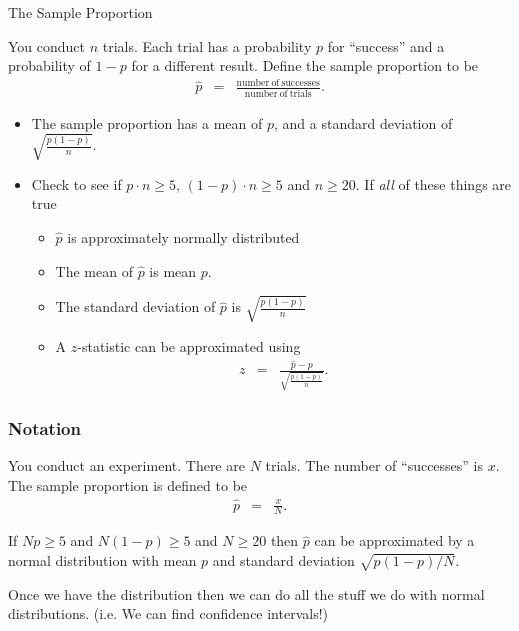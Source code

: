 \begin{frame}{The Sample Proportion}

  You conduct $n$ trials. Each trial has a probability $p$ for
  ``success'' and a probability of $1-p$ for a different
  result. Define the sample proportion to be 
  \begin{eqnarray*}
    \hat{p} & = & \frac{\mathrm{number~of~successes}}{\mathrm{number~of~trials}}.
  \end{eqnarray*}

  \begin{itemize}
  \item The sample proportion has a mean of $p$, and a standard
    deviation of $\sqrt{\frac{p(1-p)}{n}}$.
  \item Check to see if $p\cdot n \geq 5$, $(1-p)\cdot n \geq 5$ and
    $n\geq 20$. If \textit{all} of these things are true
    \begin{itemize}
    \item $\hat{p}$ is approximately normally distributed
    \item The mean of $\hat{p}$ is mean $p$.
    \item The standard deviation of $\hat{p}$ is
      $\sqrt{\frac{p(1-p)}{n}}$
    \item A $z$-statistic can be approximated using
      \begin{eqnarray*}
        z & = & \frac{\hat{p}-p}{\sqrt{\frac{p(1-p)}{n}}}.
      \end{eqnarray*}
    \end{itemize}

  \end{itemize}



  
\end{frame}


\begin{frame}
  \frametitle{Notation}


  \begin{definition}

    You conduct an experiment. There are $N$ trials. The number of
    ``successes'' is $x$.  The sample proportion is defined to be 
    \begin{eqnarray*}
      \hat{p} & = & \frac{x}{N}.
    \end{eqnarray*}

    {

      If $Np\geq 5$ and $N(1-p)\geq 5$ and $N\geq 20$ then $\hat{p}$
      can be approximated by a normal distribution with mean $p$ and
      standard deviation $\sqrt{p(1-p)/N}$.

    }

    {

      Once we have the distribution then we can do all the stuff we do
      with normal distributions. (i.e. We can find confidence intervals!)

    }

  \end{definition}
  
\end{frame}

